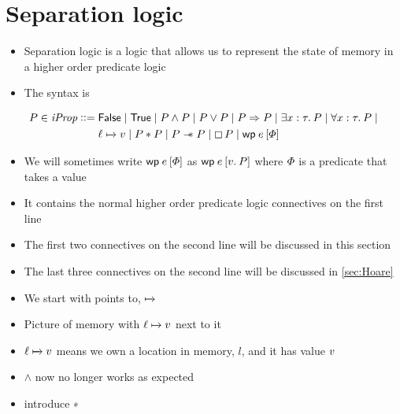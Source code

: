 \documentclass[thesis.tex]{subfiles}
\begin{document}
\section{Separation logic}
\label{sec:seplogic}
\begin{itemize}
  \item Separation logic is a logic that allows us to represent the state of memory in a higher order predicate logic
  \item The syntax is
\end{itemize}
\begin{align*}
  \prop \in \iProp \bnfdef{} & \FALSE \mid \TRUE \mid \prop \land \prop \mid \prop \lor \prop \mid \prop \Ra \prop \mid \Exists \var:\type. \prop \mid \All \var:\type. \prop \mid \\
                             & \loc \fmapsto \val \mid \prop * \prop \mid \prop \wand \prop \mid \always\prop \mid \wpre\expr{\pred}                                               \\
\end{align*}
\begin{itemize}
  \item We will sometimes write $\wpre\expr{\pred}$ as $\wpre\expr{\Ret\val. \prop}$ where $\varPhi$ is a predicate that takes a value
  \item It contains the normal higher order predicate logic connectives on the first line
  \item The first two connectives on the second line will be discussed in this section
  \item The last three connectives on the second line will be discussed in \cref*{sec:Hoare}
  \item We start with points to, $\fmapsto$
\end{itemize}
\begin{center}
\end{center}
\begin{itemize}
  \item Picture of memory with $\loc\fmapsto \val$ next to it
  \item $\loc\fmapsto\val$ means we own a location in memory, $l$, and it has value $v$
  \item $\land$ now no longer works as expected
  \item introduce ∗
\end{itemize}
\end{document}
